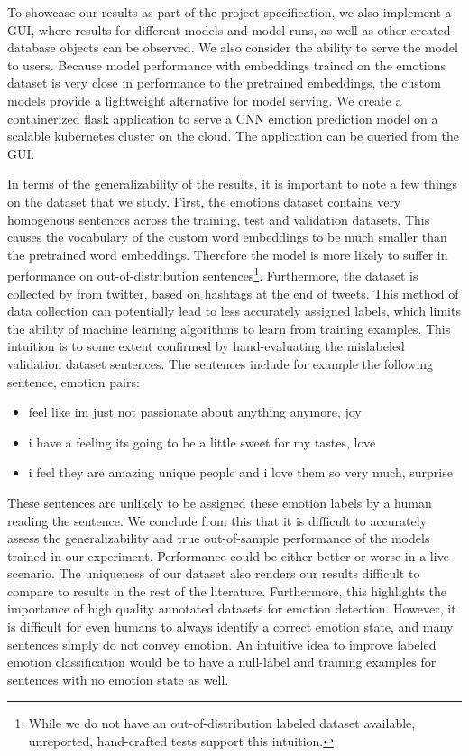 \documentclass[conference]{IEEEtran}
\begin{document}
To showcase our results as part of the project specification, we also implement a GUI, where results for different models and model runs, as well as other created database objects can be observed. We also consider the ability to serve the model to users. Because model performance with embeddings trained on the emotions dataset is very close in performance to the pretrained embeddings, the custom models provide a lightweight alternative for model serving. We create a containerized flask application to serve a CNN emotion prediction model on a scalable kubernetes cluster on the cloud. The application can be queried from the GUI.

In terms of the generalizability of the results, it is important to note a few things on the dataset that we study. First, the emotions dataset contains very homogenous sentences across the training, test and validation datasets. This causes the vocabulary of the custom word embeddings to be much smaller than the pretrained word embeddings. Therefore the model is more likely to suffer in performance on out-of-distribution sentences\footnote{While we do not have an out-of-distribution labeled dataset available, unreported, hand-crafted tests support this intuition.}. Furthermore, the dataset is collected by \cite{kaggledata} from twitter, based on hashtags at the end of tweets. This method of data collection can potentially lead to less accurately assigned labels, which limits the ability of machine learning algorithms to learn from training examples. This intuition is to some extent confirmed by hand-evaluating the mislabeled validation dataset sentences. The sentences include for example the following sentence, emotion pairs:
\begin{itemize}
\item feel like im just not passionate about anything anymore, joy
\item i have a feeling its going to be a little sweet for my tastes, love
\item i feel they are amazing unique people and i love them so very much, surprise
\end{itemize}

These sentences are unlikely to be assigned these emotion labels by a human reading the sentence. We conclude from this that it is difficult to accurately assess the generalizability and true out-of-sample performance of the models trained in our experiment. Performance could be either better or worse in a live-scenario. The uniqueness of our dataset also renders our results difficult to compare to results in the rest of the literature. Furthermore, this highlights the importance of high quality annotated datasets for emotion detection. However, it is difficult for even humans to always identify a correct emotion state, and many sentences simply do not convey emotion. An intuitive idea to improve labeled emotion classification would be to have a null-label and training examples for sentences with no emotion state as well.
\end{document}

